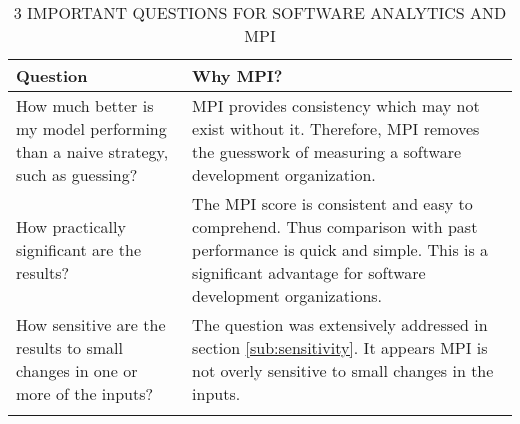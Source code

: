 \documentclass[SDSUThesis.tex]{subfiles}
\begin{document}
\begin{longtable}{p{4cm}p{10cm}}

\toprule%
 \centering%
 {\bfseries Question}
 & {\bfseries Why MPI?} \\

\cmidrule[0.4pt](r{0.125em}){1-1}%
\cmidrule[0.4pt](lr{0.125em}){2-2}%
\endhead

How much better is my model performing than a naive strategy, such as guessing? & MPI 
provides consistency which may not exist without it.  Therefore, MPI removes the 
guesswork of measuring a software development organization. \\
\myrowcolour%
How practically significant are the results? & The MPI score is consistent
and easy to comprehend.  Thus comparison with past performance is quick 
and simple.  This is a significant advantage for software 
development organizations. \\
How sensitive are the results to small changes in one or more of the inputs? & 
The question was extensively addressed in section \ref{sub:sensitivity}.  It appears MPI is
not overly sensitive to small changes in the inputs.\\

\bottomrule

\caption{3 IMPORTANT QUESTIONS FOR SOFTWARE ANALYTICS AND MPI}
\label{tab:questions}
\end{longtable}
\end{document}
